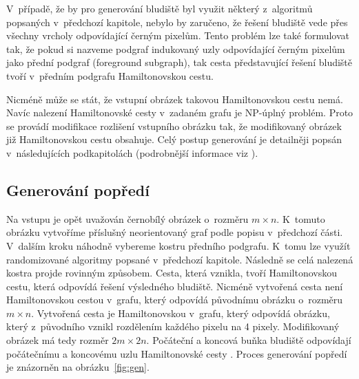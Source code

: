 \documentclass[a4paper,12pt]{article}
\begin{document}
V~případě, že by pro 
generování bludiště byl využit některý z~algoritmů popsaných v~předchozí kapitole, nebylo by zaručeno, že řešení bludiště 
vede přes všechny vrcholy odpovídající černým pixelům. Tento problém lze také formulovat tak, že pokud si nazveme podgraf 
indukovaný uzly odpovídající černým pixelům jako přední podgraf (foreground subgraph), tak cesta představující řešení 
bludiště tvoří v~předním podgrafu Hamiltonovskou cestu.

Nicméně může se stát, že vstupní obrázek takovou Hamiltonovskou cestu nemá. Navíc nalezení Hamiltonovské cesty v~zadaném
grafu je NP-úplný problém. Proto se provádí modifikace rozlišení vstupního obrázku tak, že modifikovaný obrázek
již Hamiltonovskou cestu obsahuje. Celý postup generování je detailněji popsán v~následujících podkapitolách (podrobnější informace viz \cite{pic}).

\subsection{Generování popředí}
Na vstupu je opět uvažován černobílý obrázek o~rozměru $m\times n$. K~tomuto obrázku vytvoříme příslušný neorientovaný
graf podle popisu v~předchozí části. V~dalším kroku náhodně vybereme kostru předního podgrafu. K~tomu lze využít 
randomizované algoritmy popsané v~předchozí kapitole. Následně se celá nalezená kostra projde rovinným způsobem.
Cesta, která vznikla, tvoří Hamiltonovskou cestu, která odpovídá řešení výsledného bludiště. 
Nicméně vytvořená cesta není Hamiltonovskou cestou v~grafu, který 
odpovídá původnímu obrázku o~rozměru $m\times n$. Vytvořená cesta je Hamiltonovskou v~grafu, který odpovídá obrázku, který z~původního
vznikl rozdělením každého pixelu na 4 pixely. Modifikovaný obrázek má tedy rozměr $2m\times 2n$. Počáteční a koncová
buňka bludiště odpovídají počátečnímu a koncovému uzlu Hamiltonovské cesty \cite{pic}. Proces generování popředí je znázorněn 
na obrázku~\ref{fig:gen}.
\end{document}
